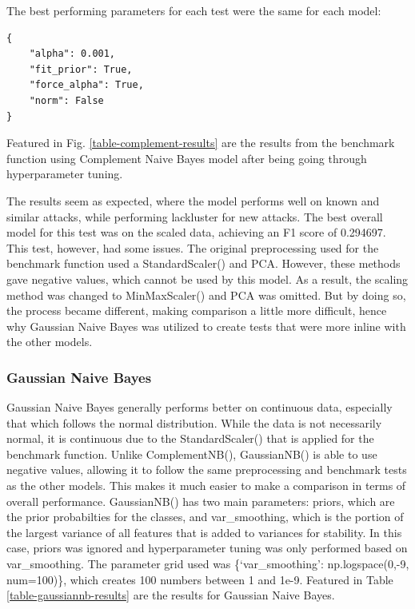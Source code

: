 \documentclass[journal]{IEEEtran}
\begin{document}
The best performing parameters for each test were the same for each model: 

\begin{lstlisting}
{
    "alpha": 0.001, 
    "fit_prior": True, 
    "force_alpha": True, 
    "norm": False
}
\end{lstlisting}
Featured in Fig. \ref{table-complement-results} are the results from the benchmark function using Complement Naive Bayes model after being going through hyperparameter tuning.



The results seem as expected, where the model performs well on known and similar attacks, while performing lackluster for new attacks. The best overall model for this test was on the scaled data, achieving an F1 score of 0.294697. This test, however, had some issues. The original preprocessing used for the benchmark function used a StandardScaler() and PCA. However, these methods gave negative values, which cannot be used by this model. As a result, the scaling method was changed to MinMaxScaler() and PCA was omitted. But by doing so, the process became different, making comparison a little more difficult, hence why Gaussian Naive Bayes was utilized to create tests that were more inline with the other models.

\subsubsection{Gaussian Naive Bayes}
Gaussian Naive Bayes generally performs better on continuous data, especially that which follows the normal distribution. While the data is not necessarily normal, it is continuous due to the StandardScaler() that is applied for the benchmark function. Unlike ComplementNB(), GaussianNB() is able to use negative values, allowing it to follow the same preprocessing and benchmark tests as the other models. This makes it much easier to make a comparison in terms of overall performance. GaussianNB() has two main parameters: priors, which are the prior probabilties for the classes, and var\_smoothing, which is the portion of the largest variance of all features that is added to variances for stability. In this case, priors was ignored and hyperparameter tuning was only performed based on var\_smoothing. The parameter grid used was \{`var\_smoothing': np.logspace(0,-9, num=100)\}, which creates 100 numbers between 1 and 1e-9. Featured in Table \ref{table-gaussiannb-results} are the results for Gaussian Naive Bayes.
\end{document}

